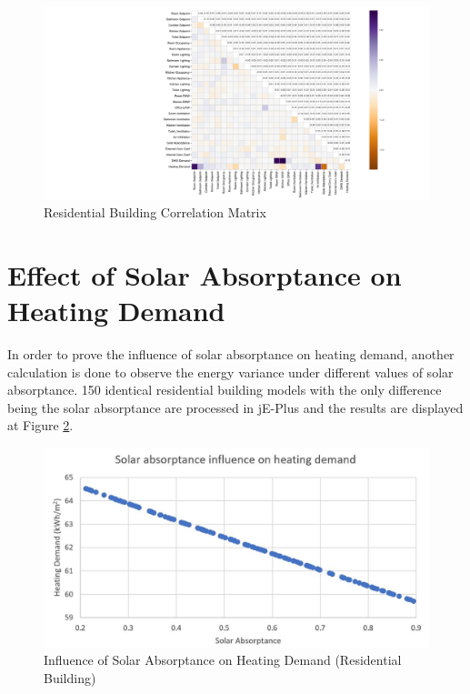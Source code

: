 \documentclass[a4paper, oneside]{discothesis}
\begin{document}
	    \begin{figure}[H]
		\centering
		\includegraphics[scale=0.6]{figures/matrix_residential.pdf}
		\caption{Residential Building Correlation Matrix}
		\label{fig:Hongg_Matrix}
		\end{figure}


  	
    \section{Effect of Solar Absorptance on Heating Demand}
			In order to prove the influence of solar absorptance on heating demand, another calculation is done to observe the energy variance under different values of solar absorptance. 150 identical residential building models with the only difference being the solar absorptance are processed in jE-Plus and the results are displayed at Figure \ref{fig:Hongg_solar}.\\
			
    	    \begin{figure}[htbp]
    		\centering
    		\includegraphics[scale=0.5]{Solar_HeatingDemand.JPG}
    		\caption{Influence of Solar Absorptance on Heating Demand (Residential Building)}
    		\label{fig:Hongg_solar}
    		\end{figure}			
        
\end{document}
